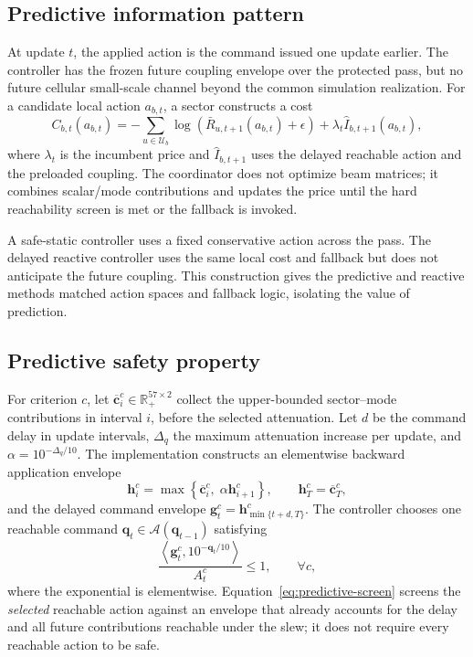 \documentclass[journal]{IEEEtran}
\newcommand{\R}{\mathbb{R}}
\newcommand{\U}{\mathcal{U}}
\begin{document}
\subsection{Predictive information pattern}
At update $t$, the applied action is the command issued one update earlier. The controller has the frozen future coupling envelope over the protected pass, but no future cellular small-scale channel beyond the common simulation realization. For a candidate local action $a_{b,t}$, a sector constructs a cost
\begin{equation}
 C_{b,t}(a_{b,t})=
 -\sum_{u\in\U_b}\log\!\left(\bar R_{u,t+1}(a_{b,t})+\epsilon\right)
 +\lambda_t \widehat I_{b,t+1}(a_{b,t}),
 \label{eq:local-cost}
\end{equation}
where $\lambda_t$ is the incumbent price and $\widehat I_{b,t+1}$ uses the delayed reachable action and the preloaded coupling. The coordinator does not optimize beam matrices; it combines scalar/mode contributions and updates the price until the hard reachability screen is met or the fallback is invoked.

A safe-static controller uses a fixed conservative action across the pass. The delayed reactive controller uses the same local cost and fallback but does not anticipate the future coupling. This construction gives the predictive and reactive methods matched action spaces and fallback logic, isolating the value of prediction.


\subsection{Predictive safety property}
For criterion $c$, let $\overline{\bm c}^{c}_{i}\in\R_{+}^{57\times2}$ collect the upper-bounded sector--mode contributions in interval $i$, before the selected attenuation. Let $d$ be the command delay in update intervals, $\Delta_q$ the maximum attenuation increase per update, and $\alpha=10^{-\Delta_q/10}$. The implementation constructs an elementwise backward application envelope
\begin{equation}
 \bm h^{c}_{i}=\max\!\left\{\overline{\bm c}^{c}_{i},\;\alpha\bm h^{c}_{i+1}\right\},
 \qquad \bm h^{c}_{T}=\overline{\bm c}^{c}_{T},
 \label{eq:application-envelope}
\end{equation}
and the delayed command envelope $\bm g^{c}_{t}=\bm h^{c}_{\min\{t+d,T\}}$. The controller chooses one reachable command $\bm q_t\in\mathcal A(\bm q_{t-1})$ satisfying
\begin{equation}
 \frac{\left\langle\bm g^{c}_{t},10^{-\bm q_t/10}\right\rangle}{A^{c}_{t}}
 \le 1,\qquad \forall c,
 \label{eq:predictive-screen}
\end{equation}
where the exponential is elementwise. Equation~\eqref{eq:predictive-screen} screens the \emph{selected} reachable action against an envelope that already accounts for the delay and all future contributions reachable under the slew; it does not require every reachable action to be safe.
\end{document}
